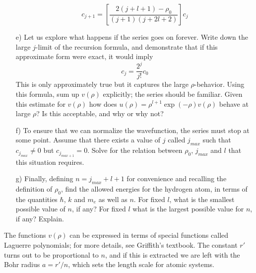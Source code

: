 \documentclass[11pt]{article}
\begin{document}
\begin{itemize}
\begin{equation}
c_{j+1} = \left[ \frac{2(j+l+1)-\rho_0}{(j+1)(j+2l+2)}\right]c_j
\end{equation}
\item[e)]
Let us explore what happens if the series goes on forever. Write down the large $j$-limit of the recursion formula,
and demonstrate that if this approximate form were exact, it would imply
\begin{equation}
c_j = \frac{2^j}{j!}c_0
\end{equation}
This is only approximately true but it captures the large $\rho$-behavior. Using this formula, sum up $v(\rho)$ explicitly;
the series should be familiar. Given this estimate for $v(\rho)$ how does $u(\rho) = \rho^{l+1}\exp(-\rho)v(\rho)$ behave
at large $\rho$? Is this acceptable, and why or why not?
\item [f)]
To ensure that we can normalize the wavefunction, the series must stop at some point. Assume that there exists a value of $j$
called $j_{max}$ such that $c_{j_{max}} \ne 0$ but $c_{j_{max+1}} = 0$. Solve for the relation between $\rho_0$, $j_{max}$ and
$l$ that this situation requires.
\item[g)]
Finally, defining $n=j_{max}+l+1$ for convenience and recalling the definition of $\rho_0$, find the allowed energies for the
hydrogen atom, in terms of the quantities $\hbar$, $k$ and $m_e$ as well as $n$. For fixed $l$, what is the smallest possible
value of $n$, if any? For fixed $l$ what is the largest possible value for $n$, if any? Explain.
\end{itemize}

The functions $v(\rho)$ can be expressed in terms of special functions called Laguerre polynomials; for more details, see Griffith's textbook. The constant $r'$ turns out to be proportional to $n$, and if this is extracted we are left with the Bohr radius 
$a = r'/n$, which sets the length scale for atomic systems.
\end{document}
